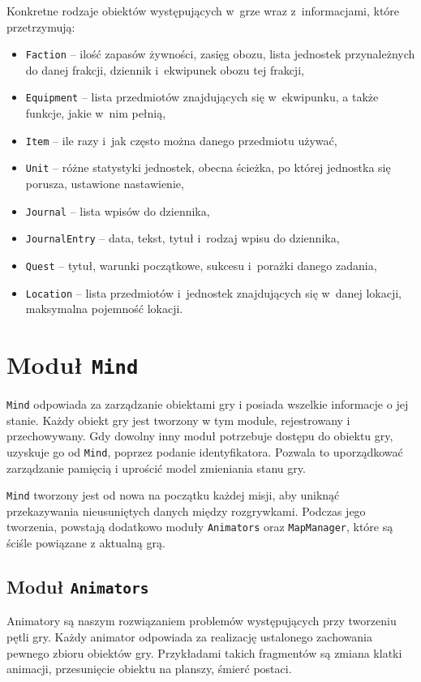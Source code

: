 \documentclass[licencjacka]{pracamgr}
\begin{document}
    Konkretne rodzaje obiektów występujących w~grze wraz z~informacjami, które przetrzymują:
    \begin{itemize}
      \item \texttt{Faction} -- ilość zapasów żywności, zasięg obozu, lista jednostek przynależnych do danej
      frakcji, dziennik i~ekwipunek obozu tej frakcji,
      \item \texttt{Equipment} -- lista przedmiotów znajdujących się w~ekwipunku, a także funkcje, jakie w~nim pełnią,
      \item \texttt{Item} --  ile razy i~jak często można danego przedmiotu używać,
      \item \texttt{Unit} -- różne statystyki jednostek, obecna ścieżka, po której jednostka się porusza, ustawione
      nastawienie,
      \item \texttt{Journal} -- lista wpisów do dziennika,
      \item \texttt{JournalEntry} -- data, tekst, tytuł i~rodzaj wpisu do dziennika,
      \item \texttt{Quest} -- tytuł, warunki początkowe, sukcesu i~porażki danego zadania,
      \item \texttt{Location} -- lista przedmiotów i~jednostek znajdujących się w~danej lokacji, maksymalna pojemność
      lokacji.
    \end{itemize}

  \section{Moduł \texttt{Mind}}

    \texttt{Mind} odpowiada za zarządzanie obiektami gry i posiada wszelkie informacje o jej stanie. 
    Każdy obiekt gry jest tworzony w tym module, rejestrowany i przechowywany. Gdy dowolny inny moduł potrzebuje dostępu do 
    obiektu gry, uzyskuje go od \texttt{Mind}, poprzez podanie identyfikatora. Pozwala to uporządkować zarządzanie pamięcią
    i uprościć model zmieniania stanu gry. 

    \texttt{Mind} tworzony jest od nowa na początku każdej misji, aby uniknąć przekazywania nieusuniętych danych między
    rozgrywkami. Podczas jego tworzenia, powstają dodatkowo moduły \texttt{Animators} oraz \texttt{MapManager}, które są
    ściśle powiązane z aktualną grą. 	
	
  \subsection{Moduł \texttt{Animators}}
    Animatory są naszym rozwiązaniem problemów występujących przy tworzeniu pętli gry. Każdy animator odpowiada
    za realizację ustalonego zachowania pewnego zbioru obiektów gry. Przykładami takich fragmentów są zmiana klatki
    animacji, przesunięcie obiektu na planszy, śmierć postaci.
    
\end{document}
